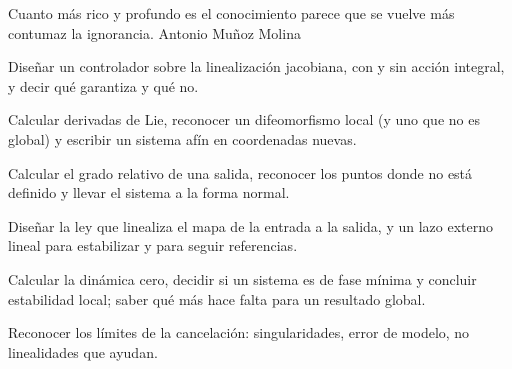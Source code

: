 
  {Cuanto más rico y profundo es el conocimiento parece que se vuelve más contumaz la ignorancia.}
  {Antonio Muñoz Molina}

\begin{objetivos}
  \item Diseñar un controlador sobre la linealización jacobiana, con y sin acción integral, y decir qué garantiza y qué no.
  \item Calcular derivadas de Lie, reconocer un difeomorfismo local (y uno que no es global) y escribir un sistema afín en coordenadas nuevas.
  \item Calcular el grado relativo de una salida, reconocer los puntos donde no está definido y llevar el sistema a la forma normal.
  \item Diseñar la ley que linealiza el mapa de la entrada a la salida, y un lazo externo lineal para estabilizar y para seguir referencias.
  \item Calcular la dinámica cero, decidir si un sistema es de fase mínima y concluir estabilidad local; saber qué más hace falta para un resultado global.
  \item Reconocer los límites de la cancelación: singularidades, error de modelo, no linealidades que ayudan.
\end{objetivos}













